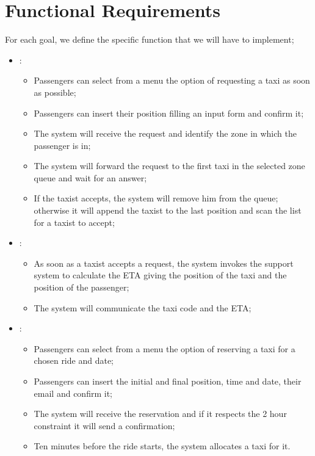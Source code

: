 ﻿
\section { Functional Requirements}
 
For each goal, we define the specific function that we will have to implement;\\
\begin {itemize}
\item [G1]:
	\begin{itemize}
	\item Passengers can select from a menu the option of requesting a taxi as soon as possible; 
	\item Passengers can insert their position filling an input form and confirm it;
	\item The system will receive the request and identify the zone in which the passenger is in;
	\item The system will forward the request to the first taxi in the selected zone queue and wait for an answer;
	\item If the taxist accepts, the system will remove him from the queue; otherwise it will append the taxist to the last position and
scan the list for a taxist to accept;
	\end{itemize}
\item [G2]:
	\begin{itemize}
	\item As soon as a taxist accepts a request, the system invokes the support system to calculate the ETA giving the position of the taxi and the position of the passenger;
	\item The system will communicate the taxi code and the ETA;
	\end{itemize}
\item [G3]:
	\begin{itemize}
	\item Passengers can select from a menu the option of reserving a taxi for a chosen ride and date; 
	\item Passengers can insert the initial and final position, time and date, their email and confirm it;%
	\item The system will receive the reservation and if it respects the 2 hour constraint it will send a confirmation;
	\item Ten minutes before the ride starts, the system allocates a taxi for it.

\end{itemize}
\end{itemize}
